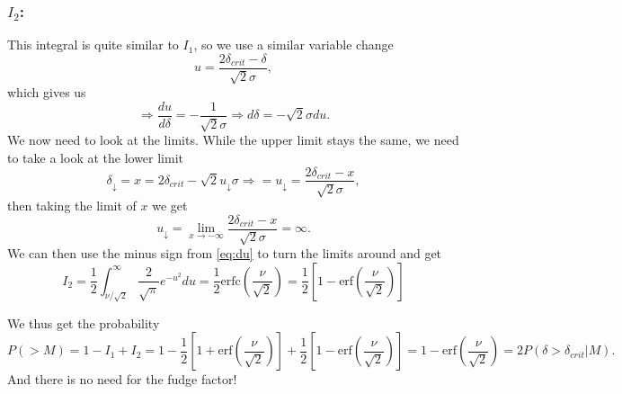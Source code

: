 \documentclass[a4paper,norsk, 10pt]{article}
\begin{document}
\subsubsection*{$I_2$:}
This integral is quite similar to $I_1$, so we use a similar variable change
\begin{equation}
u = \frac{2\delta_{crit}-\delta}{\sqrt{2}\sigma},
\end{equation}
which gives us
\begin{equation}\label{eq:du}
\Rightarrow \frac{du}{d\delta} = -\frac{1}{\sqrt{2}\sigma} \Rightarrow d\delta = -\sqrt{2}\sigma du.
\end{equation}
We now need to look at the limits. While the upper limit stays the same, we need to take a look at the lower limit
\begin{equation}
\delta_{\downarrow} = x = 2\delta_{crit} - \sqrt{2}u_{\downarrow}\sigma \Rightarrow = u_{\downarrow} = \frac{2\delta_{crit} - x}{\sqrt{2}\sigma}, 
\end{equation}
then taking the limit of $x$ we get
\begin{equation}
u_{\downarrow} =\lim_{x \rightarrow -\infty} \frac{2\delta_{crit} - x}{\sqrt{2}\sigma} = \infty.
\end{equation}
We can then use the minus sign from \eqref{eq:du} to turn the limits around and get
\begin{equation}
I_2 = \frac{1}{2}\int_{\nu/\sqrt{2}}^{\infty}\frac{2}{\sqrt{\pi}}e^{-u^2} du = \frac{1}{2}\text{erfc}\left(\frac{\nu}{\sqrt{2}}\right) = \frac{1}{2}\left[1-\text{erf}\left(\frac{\nu}{\sqrt{2}}\right)\right]
\end{equation}

We thus get the probability
\begin{equation}
P(>M) = 1-I_1 + I_2 = 1 - \frac{1}{2}\left[1+\text{erf}\left(\frac{\nu}{\sqrt{2}}\right)\right] + \frac{1}{2}\left[1-\text{erf}\left(\frac{\nu}{\sqrt{2}}\right)\right] = 1 - \text{erf}\left(\frac{\nu}{\sqrt{2}}\right) = 2P(\delta > \delta_{crit}|M).
\end{equation}
And there is no need for the fudge factor!
\end{document}

